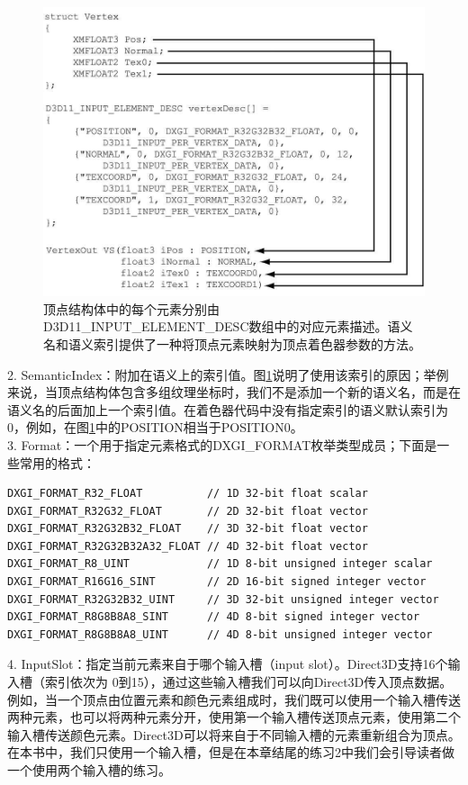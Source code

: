 \documentclass[11pt,a4paper,oldfontcommands]{memoir}
\begin{document}
{\begin{flushleft}
\begin{figure}[h]
    \includegraphics[width=\textwidth]{6-1}
    \centering
    \caption{顶点结构体中的每个元素分别由D3D11\_INPUT\_ELEMENT\_DESC数组中的对应元素描述。语义名和语义索引提供了一种将顶点元素映射为顶点着色器参数的方法。}
    \label{fig:6-1}
\end{figure}
2. SemanticIndex：附加在语义上的索引值。图\ref{fig:6-1}说明了使用该索引的原因；举例来说，当顶点结构体包含多组纹理坐标时，我们不是添加一个新的语义名，而是在语义名的后面加上一个索引值。在着色器代码中没有指定索引的语义默认索引为0，例如，在图\ref{fig:6-1}中的POSITION相当于POSITION0。\\
3. Format：一个用于指定元素格式的DXGI\_FORMAT枚举类型成员；下面是一些常用的格式：
\begin{lstlisting}
DXGI_FORMAT_R32_FLOAT          // 1D 32-bit float scalar
DXGI_FORMAT_R32G32_FLOAT       // 2D 32-bit float vector
DXGI_FORMAT_R32G32B32_FLOAT    // 3D 32-bit float vector
DXGI_FORMAT_R32G32B32A32_FLOAT // 4D 32-bit float vector
DXGI_FORMAT_R8_UINT            // 1D 8-bit unsigned integer scalar
DXGI_FORMAT_R16G16_SINT        // 2D 16-bit signed integer vector
DXGI_FORMAT_R32G32B32_UINT     // 3D 32-bit unsigned integer vector
DXGI_FORMAT_R8G8B8A8_SINT      // 4D 8-bit signed integer vector
DXGI_FORMAT_R8G8B8A8_UINT      // 4D 8-bit unsigned integer vector
\end{lstlisting}
4. InputSlot：指定当前元素来自于哪个输入槽（input slot）。Direct3D支持16个输入槽（索引依次为 0到15），通过这些输入槽我们可以向Direct3D传入顶点数据。例如，当一个顶点由位置元素和颜色元素组成时，我们既可以使用一个输入槽传送两种元素，也可以将两种元素分开，使用第一个输入槽传送顶点元素，使用第二个输入槽传送颜色元素。Direct3D可以将来自于不同输入槽的元素重新组合为顶点。在本书中，我们只使用一个输入槽，但是在本章结尾的练习2中我们会引导读者做一个使用两个输入槽的练习。\\

\end{flushleft}}
\end{document}
